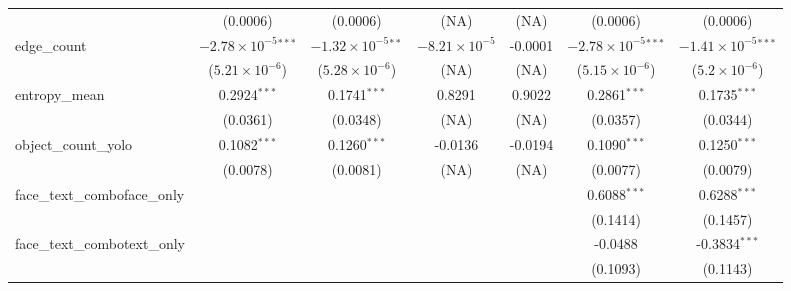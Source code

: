 \begin{table}[htbp]
\begin{tabular}{lcccccc}
                                     & (0.0006)                       & (0.0006)                      & (NA)                   & (NA)                 & (0.0006)                       & (0.0006)\\   
      edge\_count                    & $-2.78\times 10^{-5}$$^{***}$  & $-1.32\times 10^{-5}$$^{**}$  & $-8.21\times 10^{-5}$  & -0.0001              & $-2.78\times 10^{-5}$$^{***}$  & $-1.41\times 10^{-5}$$^{***}$\\    
                                     & ($5.21\times 10^{-6}$)         & ($5.28\times 10^{-6}$)        & (NA)                   & (NA)                 & ($5.15\times 10^{-6}$)         & ($5.2\times 10^{-6}$)\\    
      entropy\_mean                  & 0.2924$^{***}$                 & 0.1741$^{***}$                & 0.8291                 & 0.9022               & 0.2861$^{***}$                 & 0.1735$^{***}$\\   
                                     & (0.0361)                       & (0.0348)                      & (NA)                   & (NA)                 & (0.0357)                       & (0.0344)\\   
      object\_count\_yolo            & 0.1082$^{***}$                 & 0.1260$^{***}$                & -0.0136                & -0.0194              & 0.1090$^{***}$                 & 0.1250$^{***}$\\   
                                     & (0.0078)                       & (0.0081)                      & (NA)                   & (NA)                 & (0.0077)                       & (0.0079)\\   
      face\_text\_comboface\_only    &                                &                               &                        &                      & 0.6088$^{***}$                 & 0.6288$^{***}$\\   
                                     &                                &                               &                        &                      & (0.1414)                       & (0.1457)\\   
      face\_text\_combotext\_only    &                                &                               &                        &                      & -0.0488                        & -0.3834$^{***}$\\   
                                     &                                &                               &                        &                      & (0.1093)                       & (0.1143)\\   

\end{tabular}
\end{table}
